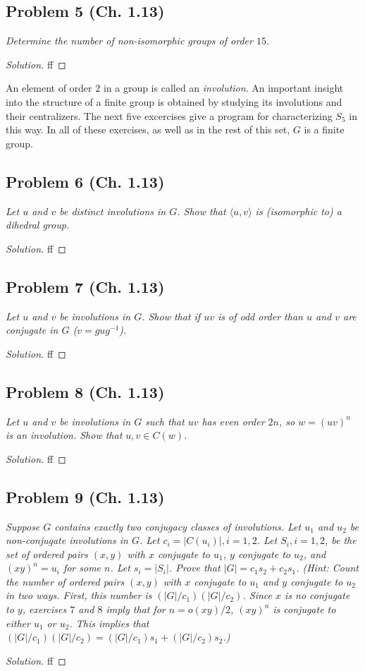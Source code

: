 \documentclass{article}
\begin{document}
\subsection*{Problem 5 (Ch. 1.13)}
{\it Determine the number of non-isomorphic groups of order $15$.}
\begin{proof}[Solution]\let\qed\relax
	ff
\end{proof}

An element of order $2$ in a group is called an \emph{involution}.
An important insight into the structure of a finite group is obtained
by studying its involutions and their centralizers.
The next five excercises give a program for characterizing $S_5$ in this way.
In all of these exercises, as well as in the rest of this set, $G$ is a finite group.

\subsection*{Problem 6 (Ch. 1.13)}
{\it Let $u$ and $v$ be distinct involutions in $G$.
Show that $\langle u,v \rangle$ is (isomorphic to) a dihedral group.}
\begin{proof}[Solution]\let\qed\relax
	ff
\end{proof}

\subsection*{Problem 7 (Ch. 1.13)}
{\it Let $u$ and $v$ be involutions in $G$.
Show that if $uv$ is of odd order than $u$ and $v$
are conjugate in $G$ ($v = gug^{-1}$).}
\begin{proof}[Solution]\let\qed\relax
	ff
\end{proof}

\subsection*{Problem 8 (Ch. 1.13)}
{\it Let $u$ and $v$ be involutions in $G$ such that $uv$ has even order $2n$,
so $w = (uv)^n$ is an involution.
Show that $u,v \in C(w)$.}
\begin{proof}[Solution]\let\qed\relax
	ff
\end{proof}


\subsection*{Problem 9 (Ch. 1.13)}
{\it Suppose $G$ contains exactly two conjugacy classes of involutions.
Let $u_1$ and $u_2$ be non-conjugate involutions in $G$.
Let $c_i = |C(u_i)|, i =1,2$.
Let $S_i, i=1,2$, be the set of ordered pairs $(x,y)$ with
$x$ conjugate to $u_1$, $y$ conjugate to $u_2$, and $(xy)^n = u_i$ for some $n$.
Let $s_i = |S_i|$. Prove that $|G| = c_1s_2 + c_2s_1$.
(\emph{Hint}: Count the number of ordered pairs $(x,y)$
with $x$ conjugate to $u_1$ and $y$ conjugate to $u_2$ in two ways.
First, this number is $(|G|/c_1)(|G|/c_2)$.
Since $x$ is no conjugate to $y$, exercises $7$ and $8$ imply that
for $n = o(xy)/2$, $(xy)^n$ is conjugate to either $u_1$ or $u_2$.
This implies that $(|G|/c_1)(|G|/c_2) = (|G|/c_1)s_1 + (|G|/c_2)s_2$.)}
\begin{proof}[Solution]\let\qed\relax
	ff
\end{proof}
\end{document}
